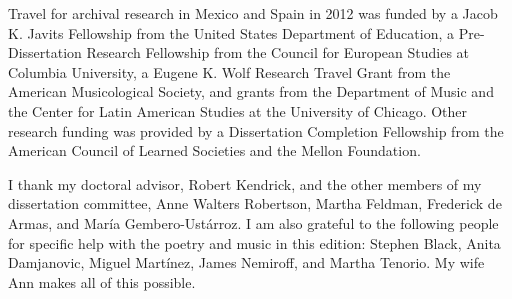 Travel for archival research in Mexico and Spain in 2012 was funded by 
a Jacob K. Javits Fellowship from the United States Department of Education, 
a Pre-Dissertation Research Fellowship from the Council for European Studies at Columbia University, 
a Eugene K. Wolf Research Travel Grant from the American Musicological Society, 
and grants from the Department of Music and the Center for Latin American Studies at the University of Chicago.
Other research funding was provided by a Dissertation Completion Fellowship from the American Council of Learned Societies and the Mellon Foundation.

I thank my doctoral advisor, Robert Kendrick, and the other members of my dissertation committee, Anne Walters Robertson, Martha Feldman, Frederick de Armas, and María Gembero-Ustárroz.
I am also grateful to the following people for specific help with the poetry and music in this edition:
Stephen Black,
Anita Damjanovic, 
Miguel Martínez, 
James Nemiroff, and
Martha Tenorio.
My wife Ann makes all of this possible.

